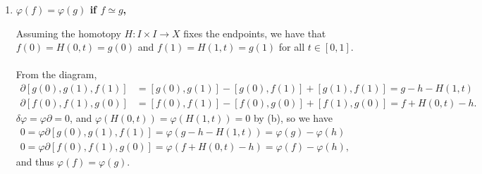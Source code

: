 \documentclass[12pt]{article}
\newcommand*\sq{\mathbin{\vcenter{\hbox{\rule{.4ex}{.4ex}}}}}
\begin{document}
\begin{enumerate}
\begin{enumerate}
            \item
                \boldmath\textbf{$\varphi(f) = \varphi(g)$ if $f \simeq g$,
                }\unboldmath \par

                Assuming the homotopy $H : I \times I \to X$ fixes the endpoints, we have that $f(0) = H(0, t) = g(0)$ and $f(1) = H(1, t) = g(1)$ for all $t \in [0, 1]$. \\
                \vspace{2.5cm} \\
                From the diagram,
                \begin{align*}
                    \partial[g(0), g(1), f(1)] &= [g(0), g(1)] - [g(0), f(1)] + [g(1), f(1)] = g - h - H(1, t) \\
                    \partial[f(0), f(1), g(0)] &= [f(0), f(1)] - [f(0), g(0)] + [f(1), g(0)] = f + H(0, t) - h.
                \end{align*}
                $\delta\varphi = \varphi\partial = 0$, and $\varphi(H(0, t)) = \varphi(H(1, t)) = 0$ by (b), so we have
                \begin{align*}
                    0 = \varphi\partial[g(0), g(1), f(1)] = \varphi(g - h - H(1, t)) = \varphi(g) - \varphi(h) \\
                    0 = \varphi\partial[f(0), f(1), g(0)] = \varphi(f + H(0, t) - h) = \varphi(f) - \varphi(h),
                \end{align*}
                and thus $\varphi(f) = \varphi(g)$.


\end{enumerate}
\end{enumerate}
\end{document}
